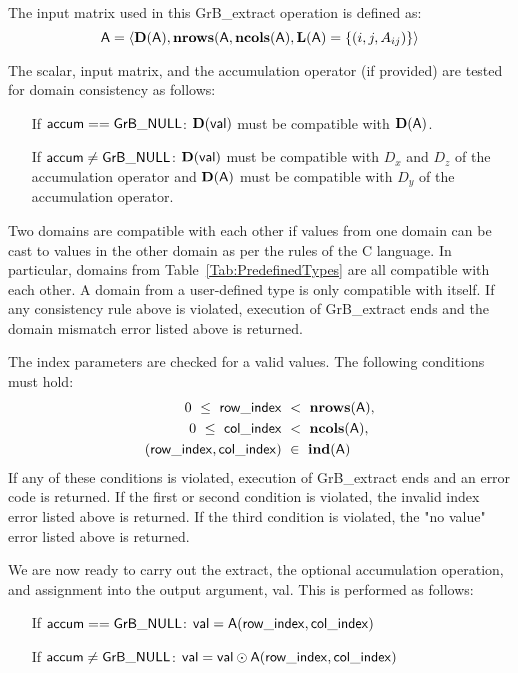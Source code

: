 The input matrix used in this {\sf GrB\_extract} operation is defined as:
\[
	{\sf A} = \langle \bold{D}({\sf A}),\bold{nrows}({\sf A},\bold{ncols}({\sf A}),
    \bold{L}({\sf A}) = \{(i,j,A_{ij}) \} \rangle
\]

The scalar, input matrix, and the accumulation 
operator (if provided) are tested for domain consistency as follows:
\begin{itemize}[leftmargin=2.2in]
	\item[If ${\sf accum} == {\sf GrB\_NULL}$:]  $\bold{D}({\sf val})$ must be 
    compatible with $\bold{D}({\sf A})$.

	\item[If ${\sf accum} \neq {\sf GrB\_NULL}$:]  $\bold{D}({\sf val})$ must
    be compatible with $D_x$ and $D_z$ of the accumulation operator and 
    $\bold{D}({\sf A})$ must be compatible with $D_y$ of the accumulation operator.
\end{itemize}
Two domains are compatible with each other if values from one domain can be cast 
to values in the other domain as per the rules of the C language.
In particular, domains from Table~\ref{Tab:PredefinedTypes} are all compatible 
with each other. A domain from a user-defined type is only compatible with itself.
If any consistency rule above is violated, execution of {\sf GrB\_extract} ends
and the domain mismatch error listed above is returned.

The index parameters are checked for a valid values.  The following
conditions must hold:
\[
\begin{aligned}
    0\ \leq\ {\sf row\_index} & \ <\ \bold{nrows}({\sf A}), \\
    0\ \leq\ {\sf col\_index} & \ <\ \bold{ncols}({\sf A}), \\
    ({\sf row\_index},{\sf col\_index}) & \ \in \ \bold{ind}({\sf A})
\end{aligned}
\]
If any of these conditions is violated, execution of {\sf GrB\_extract} ends and
an error code is returned. If the first or second condition is violated, the invalid 
index error listed above is returned.  If the third condition is violated,
the "no value" error listed above is returned.

We are now ready to carry out the extract, the optional accumulation
operation, and assignment into the output argument, {\sf val}.  This is performed
as follows:
\begin{itemize}[leftmargin=2.2in]
	\item[If ${\sf accum} == {\sf GrB\_NULL}$:] ${\sf val} = 
    {\sf A}({\sf row\_index},{\sf col\_index})$
    \item[If ${\sf accum} \neq {\sf GrB\_NULL}$:] ${\sf val} = {\sf val} \odot 
    {\sf A}({\sf row\_index},{\sf col\_index})$
\end{itemize}

